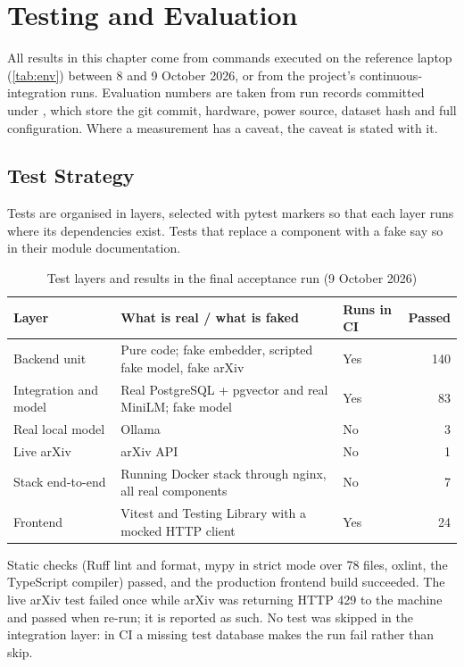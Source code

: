 \chapter{Testing and Evaluation}\label{ch:testing}

All results in this chapter come from commands executed on the reference laptop (\autoref{tab:env}) between 8 and 9
October 2026, or from the project's continuous-integration runs. Evaluation numbers are taken from run records
committed under , which store the git commit, hardware, power source, dataset hash and full
configuration. Where a measurement has a caveat, the caveat is stated with it.

\section{Test Strategy}

Tests are organised in layers, selected with pytest markers so that each layer runs where its dependencies exist.
Tests that replace a component with a fake say so in their module documentation.

\begin{table}[htbp]
  \centering
  \caption{Test layers and results in the final acceptance run (9 October 2026)}\label{tab:testlayers}
  {\small
  \begin{tabularx}{\textwidth}{@{}lLlr@{}}
    \toprule
    \textbf{Layer} & \textbf{What is real / what is faked} & \textbf{Runs in CI} & \textbf{Passed} \\
    \midrule
    Backend unit & Pure code; fake embedder, scripted fake model, fake arXiv & Yes & 140 \\
    Integration and model & Real PostgreSQL + pgvector and real MiniLM; fake model & Yes & 83 \\
    Real local model & Ollama  & No & 3 \\
    Live arXiv & arXiv API & No & 1 \\
    Stack end-to-end & Running Docker stack through nginx, all real components & No & 7 \\
    Frontend & Vitest and Testing Library with a mocked HTTP client & Yes & 24 \\
    \bottomrule
  \end{tabularx}
  }
\end{table}

Static checks (Ruff lint and format, mypy in strict mode over 78 files, oxlint, the TypeScript compiler) passed, and
the production frontend build succeeded. The live arXiv test failed once while arXiv was returning HTTP 429 to the
machine and passed when re-run; it is reported as such. No test was skipped in the integration layer: in CI a
missing test database makes the run fail rather than skip.

